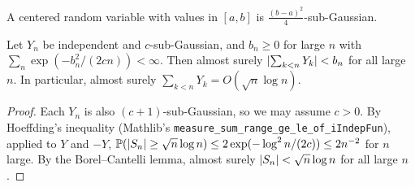 \begin{lemma}
  \label{lem:hoeffding_lemma_null}
  \mathlibok
  A centered random variable with values in $[a, b]$ is $\frac{(b-a)^2}{4}$-sub-Gaussian.
\end{lemma}

\begin{lemma}
  \label{lem:hoeffding_rate}
  \leanok
  Let $Y_n$ be independent and $c$-sub-Gaussian, and $b_n \ge 0$ for large $n$ with
  $\sum_n \exp(-b_n^2/(2cn)) < \infty$. Then almost surely $\lvert \sum_{k<n} Y_k \rvert < b_n$ for all
  large $n$. In particular, almost surely $\sum_{k<n} Y_k = O(\sqrt n \log n)$.
\end{lemma}

\begin{proof}
  \leanok
  Each $Y_n$ is also $(c+1)$-sub-Gaussian, so we may assume $c > 0$.
  By Hoeffding's inequality (Mathlib's \texttt{measure\_sum\_range\_ge\_le\_of\_iIndepFun}), applied
  to $Y$ and $-Y$, $\mathbb{P}(\lvert S_n \rvert \ge \sqrt n \log n) \le 2 \exp(-\log^2 n/(2c)) \le 2n^{-2}$ for
  $n$ large. By the Borel--Cantelli lemma, almost surely $\lvert S_n \rvert < \sqrt n \log n$ for all large
  $n$.
\end{proof}
